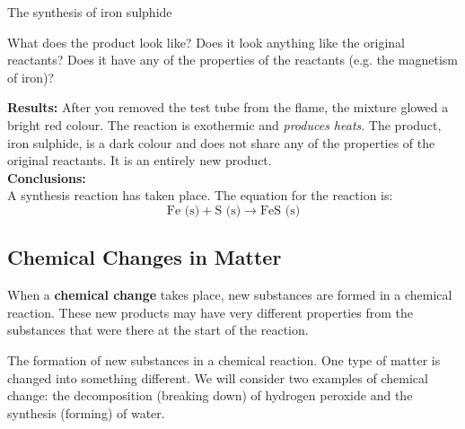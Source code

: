 \begin{g_experiment}{The synthesis of iron sulphide }
\begin{enumerate}[noitemsep, label=\textbf{\arabic*}. ]
What does the product look like? Does it look anything like the original reactants? Does it have any of the properties of the reactants (e.g. the magnetism of iron)?
\end{enumerate}
        \label{m38709*eip-963}
      \label{m38709*id63554}\noindent{}\textbf{Results:} 
After you removed the test tube from the flame, the mixture glowed a bright red colour. The reaction is exothermic and \textsl{produces heats}. The product, iron sulphide, is a dark colour and does not share any of the properties of the original reactants. It is an entirely new product.\\
        \label{m38709*id63594}\noindent{}\textbf{Conclusions:} \\
A synthesis reaction has taken place. The equation for the reaction is:
        \label{m38709*id63604}\nopagebreak\noindent{}
    \begin{equation*}
    \text{Fe (s)}+\text{S (s)}\to \text{FeS (s)}
      \end{equation*} 
\end{g_experiment}
    \label{m38709*cid3}
            \subsection*{Chemical Changes in Matter}
            \nopagebreak
      \label{m38709*id62778}When a \textbf{chemical change} takes place, new substances are formed in a chemical reaction. These new products may have very different properties from the substances that were there at the start of the reaction.\par 
            \label{m38709*fhsst!!!underscore!!!id107}
  { \label{m38709*meaningfhsst!!!underscore!!!id107}
      The formation of new substances in a chemical reaction. One type of matter is changed into something different. 
       } 
We will consider two examples of chemical change: the decomposition (breaking down) of hydrogen peroxide and the synthesis (forming) of water. \\
